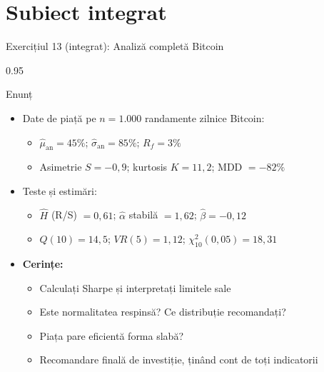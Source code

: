 \documentclass[9pt, aspectratio=169, t]{beamer}
\begin{document}
\section{Subiect integrat}

\begin{frame}[shrink=25]{Exercițiul 13 (integrat): Analiză completă Bitcoin}
\begin{cminipage}{0.95\textwidth}
\begin{block}{Enunț}
\begin{itemize}\setlength{\itemsep}{0pt}
    \item Date de piață pe $n = 1.000$ randamente zilnice Bitcoin:
    \begin{itemize}\setlength{\itemsep}{0pt}
        \item $\hat\mu_{\text{an}} = 45\%$; $\hat\sigma_{\text{an}} = 85\%$; $R_f = 3\%$
        \item Asimetrie $S = -0{,}9$; kurtosis $K = 11{,}2$; MDD $= -82\%$
    \end{itemize}
    \item Teste și estimări:
    \begin{itemize}\setlength{\itemsep}{0pt}
        \item $\hat H$ (R/S) $= 0{,}61$; $\hat\alpha$ stabilă $= 1{,}62$; $\hat\beta = -0{,}12$
        \item $Q(10) = 14{,}5$; $VR(5) = 1{,}12$; $\chi^2_{10}(0{,}05) = 18{,}31$
    \end{itemize}
    \item \textbf{Cerințe:}
    \begin{itemize}\setlength{\itemsep}{0pt}
        \item Calculați Sharpe și interpretați limitele sale
        \item Este normalitatea respinsă? Ce distribuție recomandați?
        \item Piața pare eficientă forma slabă?
        \item Recomandare finală de investiție, ținând cont de toți indicatorii
    \end{itemize}
\end{itemize}
\end{block}
\end{cminipage}
\end{frame}
\end{document}
